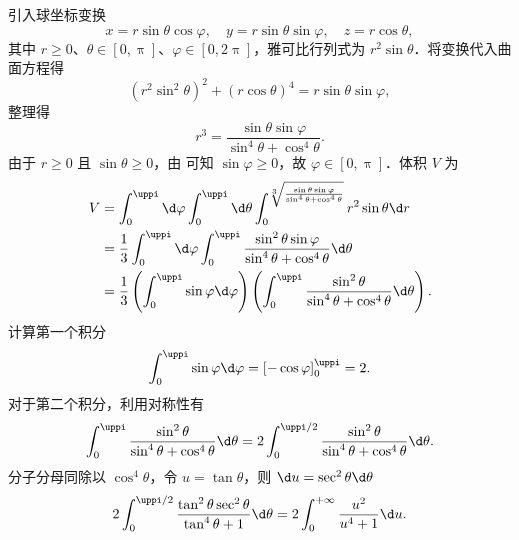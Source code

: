 \begin{solution}
    引入球坐标变换
    \begin{equation}
        x = r \sin \theta \cos \varphi, \quad y = r \sin \theta \sin \varphi, \quad z = r \cos \theta,
    \end{equation}
    其中 $r \ge 0$、$\theta \in [0, \uppi]$、$\varphi \in [0, 2\uppi]$，雅可比行列式为 $r^2 \sin \theta$．将变换代入曲面方程得
    \begin{equation}
        (r^2 \sin^2 \theta)^2 + (r \cos \theta)^4 = r \sin \theta \sin \varphi,
    \end{equation}
    整理得
    \begin{equation}
        \label{eq:rho-theta-phi}
        r^3 = \frac{\sin \theta \sin \varphi}{\sin^4 \theta + \cos^4 \theta}.
    \end{equation}
    由于 $r \ge 0$ 且 $\sin \theta \ge 0$，由  可知 $\sin \varphi \ge 0$，故 $\varphi \in [0, \uppi]$．体积 $V$ 为
    \begin{equation}
        \begin{aligned}
            V & = \int_{0}^{\uppi} \d \varphi \int_{0}^{\uppi} \d \theta \int_{0}^{\sqrt[3]{\frac{\sin \theta \sin \varphi}{\sin^4 \theta + \cos^4 \theta}}} r^2 \sin \theta \d r    \\
              & = \frac{1}{3} \int_{0}^{\uppi} \d \varphi \int_{0}^{\uppi} \frac{\sin^2 \theta \sin \varphi}{\sin^4 \theta + \cos^4 \theta} \d \theta                                \\
              & = \frac{1}{3} \left( \int_{0}^{\uppi} \sin \varphi \d \varphi \right) \left( \int_{0}^{\uppi} \frac{\sin^2 \theta}{\sin^4 \theta + \cos^4 \theta} \d \theta \right).
        \end{aligned}
    \end{equation}
    计算第一个积分
    \begin{equation}
        \int_{0}^{\uppi} \sin \varphi \d \varphi = \left[ -\cos \varphi \right]_{0}^{\uppi} = 2.
    \end{equation}
    对于第二个积分，利用对称性有
    \begin{equation}
        \int_{0}^{\uppi} \frac{\sin^2 \theta}{\sin^4 \theta + \cos^4 \theta} \d \theta = 2 \int_{0}^{\uppi/2} \frac{\sin^2 \theta}{\sin^4 \theta + \cos^4 \theta} \d \theta.
    \end{equation}
    分子分母同除以 $\cos^4 \theta$，令 $u = \tan \theta$，则 $\d u = \sec^2 \theta \d \theta$
    \begin{equation}
        2 \int_{0}^{\uppi/2} \frac{\tan^2 \theta \sec^2 \theta}{\tan^4 \theta + 1} \d \theta = 2 \int_{0}^{+\infty} \frac{u^2}{u^4 + 1} \d u.

\end{equation}
\end{solution}
